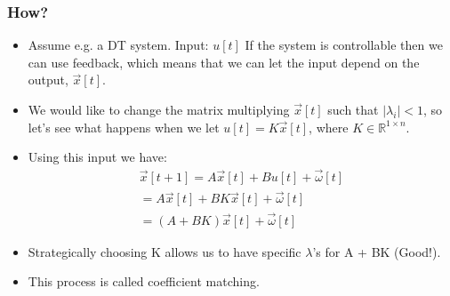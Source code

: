 \documentclass{beamer}
\newcommand{\R}{\mathbb{R}}
\begin{document}
\begin{frame}
\frametitle{How?}
\begin{itemize}
\item Assume e.g. a DT system. Input: $u[t]$ If the system is controllable then we can use feedback, which means that we can let the input depend on the output, $\vec{x}[t]$.
\item We would like to change the matrix multiplying $\vec{x}[t]$ such that  $|\lambda_i|<1$, so let's see what happens when we let $u[t] = K\vec{x}[t]$, where $K \in \R^{1 \times n}$.
\item Using this input we have: 
\begin{align*}
\vec{x}[t+1] = A\vec{x}[t] + Bu[t] + \vec{\omega}[t]\\
= A\vec{x}[t] + BK\vec{x}[t] + \vec{\omega}[t]\\
= (A + BK)\vec{x}[t] + \vec{\omega}[t]
\end{align*}

\item Strategically choosing K allows us to have specific $\lambda$'s for A + BK (Good!).
\item This process is called coefficient matching. 
\end{itemize}
\end{frame}
\end{document}
